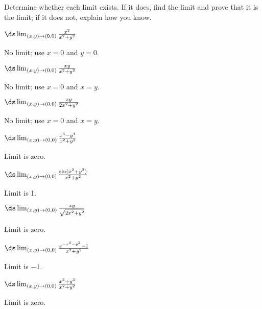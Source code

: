 \begin{enumialphparenastyle}

Determine whether each limit exists. If it does, find the limit
and prove that it is the limit; if it does not, explain how you know.

\begin{ex}
$\ds\lim_{(x,y)\to(0,0)}{x^2\over x^2+y^2}$
\begin{sol}
No limit; use $x=0$ and $y=0$.
\end{sol}
\end{ex}

\begin{ex}
$\ds\lim_{(x,y)\to(0,0)}{xy\over x^2+y^2}$
\begin{sol}
No limit; use $x=0$ and $x=y$.
\end{sol}
\end{ex}

\begin{ex}
$\ds\lim_{(x,y)\to(0,0)}{xy\over 2x^2+y^2}$
\begin{sol}
No limit; use $x=0$ and $x=y$.
\end{sol}
\end{ex}

\begin{ex}
$\ds\lim_{(x,y)\to(0,0)}{x^4-y^4\over x^2+y^2}$
\begin{sol}
Limit is zero.
\end{sol}
\end{ex}

\begin{ex}
$\ds\lim_{(x,y)\to(0,0)}{\sin(x^2+y^2)\over x^2+y^2}$
\begin{sol}
Limit is 1.
\end{sol}
\end{ex}

\begin{ex}
$\ds\lim_{(x,y)\to(0,0)}{xy\over \sqrt{2x^2+y^2}}$
\begin{sol}
Limit is zero.
\end{sol}
\end{ex}

\begin{ex}
$\ds\lim_{(x,y)\to(0,0)} {e^{-x^2-y^2}-1\over x^2+y^2}$
\begin{sol}
Limit is $-1$.
\end{sol}
\end{ex}

\begin{ex}
$\ds\lim_{(x,y)\to(0,0)}{x^3+y^3\over x^2+y^2}$
\begin{sol}
Limit is zero.
\end{sol}
\end{ex}


\end{enumialphparenastyle}
